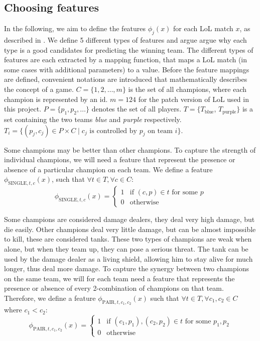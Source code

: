 \subsection{Choosing features}\label{sec:choosingfeatures}
In the following, we aim to define the features $\phi_j(x)$ for each LoL match $x$, as described in .
We define 5 different types of features and argue argue why each type is a good candidates for predicting the winning team.
The different types of features are each extracted by a mapping function, that maps a LoL match (in some cases with additional parameters) to a value. 
Before the feature mappings are defined, convenient notations are introduced that mathematically describes the concept of a game.
$C = \{1, 2, \dots, m\}$ is the set of all champions, where each champion is represented by an id. $m = 124$ for the patch version of LoL used in this project.
$P = \{p_1, p_2, \dots\}$ denotes the set of all players.
$T = \{T_\text{blue}$, $T_\text{purple}\}$ is a set containing the two teams \emph{blue} and \emph{purple} respectively.
$T_i = \{ (p_j, c_j) \in P \times C \mid c_j \text{ is controlled by } p_j \text{ on team } i \}$.

Some champions may be better than other champions. To capture the strength of individual champions, we will need a feature that represent the presence or absence of a particular champion on each team.
We define a feature $\phi_{\text{SINGLE}, t, c}(x)$, such that $\forall t \in T, \forall c \in C:$
\[
\phi_{\text{SINGLE}, t, c}(x) = 
\begin{cases} 
  1 & \text{if } (c, p) \in t \text{ for some } p \\
  0 & \text{otherwise} 
\end{cases}
\]

Some champions are considered damage dealers, they deal very high damage, but die easily. Other champions deal very little damage, but can be almost impossible to kill, these are considered tanks. These two types of champions are weak when alone, but when they team up, they can pose a serious threat. The tank can be used by the damage dealer as a living shield, allowing him to stay alive for much longer, thus deal more damage.
To capture the synergy between two champions on the same team, we will for each team need a feature that represents the presence or absence of every 2-combination of champions on that team. Therefore, we define a feature $\phi_{\text{PAIR},t, c_1, c_2}(x)$ such that $\forall t \in T, \forall c_1, c_2 \in C$ where $c_1 < c_2$:
\[
\phi_{\text{PAIR}, t, c_1, c_2}(x) =
\begin{cases}
  1 & \text{if } (c_1, p_1), (c_2, p_2) \in t \text{ for some }p_1, p_2\\
  0 & \text{otherwise}
\end{cases}
\]


